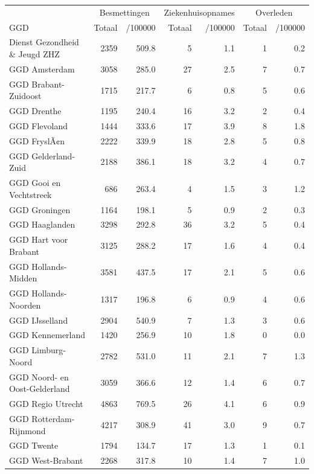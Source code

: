 \documentclass[
  english,
  man,floatsintext]{apa6}
\begin{document}
\begin{table}
\centering\begingroup\fontsize{10}{12}\selectfont

\begin{threeparttable}
\begin{tabular}{lrrrrrr}
\toprule
\multicolumn{1}{c}{ } & \multicolumn{2}{c}{Besmettingen} & \multicolumn{2}{c}{Ziekenhuisopnames} & \multicolumn{2}{c}{Overleden} \\
\cmidrule(l{3pt}r{3pt}){2-3} \cmidrule(l{3pt}r{3pt}){4-5} \cmidrule(l{3pt}r{3pt}){6-7}
GGD & Totaal & /100000 & Totaal & /100000 & Totaal & /100000\\
\midrule
Dienst Gezondheid \& Jeugd ZHZ & 2359 & 509.8 & 5 & 1.1 & 1 & 0.2\\
GGD Amsterdam & 3058 & 285.0 & 27 & 2.5 & 7 & 0.7\\
GGD Brabant-Zuidoost & 1715 & 217.7 & 6 & 0.8 & 5 & 0.6\\
GGD Drenthe & 1195 & 240.4 & 16 & 3.2 & 2 & 0.4\\
GGD Flevoland & 1444 & 333.6 & 17 & 3.9 & 8 & 1.8\\
GGD FryslÃ¢n & 2222 & 339.9 & 18 & 2.8 & 5 & 0.8\\
GGD Gelderland-Zuid & 2188 & 386.1 & 18 & 3.2 & 4 & 0.7\\
GGD Gooi en Vechtstreek & 686 & 263.4 & 4 & 1.5 & 3 & 1.2\\
GGD Groningen & 1164 & 198.1 & 5 & 0.9 & 2 & 0.3\\
GGD Haaglanden & 3298 & 292.8 & 36 & 3.2 & 5 & 0.4\\
GGD Hart voor Brabant & 3125 & 288.2 & 17 & 1.6 & 4 & 0.4\\
GGD Hollands-Midden & 3581 & 437.5 & 17 & 2.1 & 5 & 0.6\\
GGD Hollands-Noorden & 1317 & 196.8 & 6 & 0.9 & 4 & 0.6\\
GGD IJsselland & 2904 & 540.9 & 7 & 1.3 & 3 & 0.6\\
GGD Kennemerland & 1420 & 256.9 & 10 & 1.8 & 0 & 0.0\\
GGD Limburg-Noord & 2782 & 531.0 & 11 & 2.1 & 7 & 1.3\\
GGD Noord- en Oost-Gelderland & 3059 & 366.6 & 12 & 1.4 & 6 & 0.7\\
GGD Regio Utrecht & 4863 & 769.5 & 26 & 4.1 & 6 & 0.9\\
GGD Rotterdam-Rijnmond & 4217 & 308.9 & 41 & 3.0 & 9 & 0.7\\
GGD Twente & 1794 & 134.7 & 17 & 1.3 & 1 & 0.1\\
GGD West-Brabant & 2268 & 317.8 & 10 & 1.4 & 7 & 1.0\\

\end{tabular}
\end{threeparttable}
\end{table}
\end{document}

